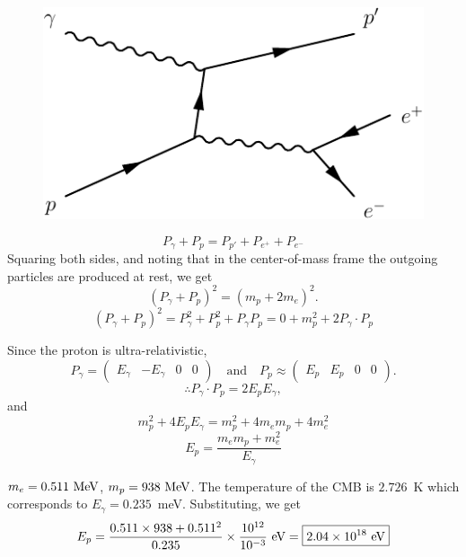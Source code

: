 \begin{figure}[H]
  \centering
  \includegraphics{feynmp/BH_pg.pdf}
\end{figure}

\begin{equation}
  P_\gamma + P_p = P_{p'} + P_{e^{+}} + P_{e^{-}}
\end{equation}
Squaring both sides, and noting that in the center-of-mass frame the outgoing particles are produced at rest, we get
\begin{equation}
  (P_\gamma + P_p)^2 = (m_p + 2m_e)^2.
\end{equation}
\begin{equation}
  (P_\gamma + P_p)^2 = P_\gamma^2 + P_p^2 + P_\gamma P_p = 0 + m_p^2 + 2 P_\gamma \cdot P_p
\end{equation}

Since the proton is ultra-relativistic,
\begin{equation}
  P_\gamma =  \begin{pmatrix} E_\gamma & -E_\gamma & 0 & 0 \end{pmatrix}
  \quad \text{and} \quad
  P_p \approx \begin{pmatrix} E_p      & E_p       & 0 & 0 \end{pmatrix}.
\end{equation}
\begin{equation}
  \therefore P_\gamma \cdot P_p = 2 E_p E_\gamma,
\end{equation}
and
\begin{equation}
  m_p^2 + 4 E_p E_\gamma = m_p^2 + 4 m_e m_p + 4 m_e^2
\end{equation}
\begin{equation}
  \boxed{ E_p = \frac{m_e m_p + m_e^2}{E_\gamma} }
\end{equation}

$m_e = 0.511~\text{MeV}$, $m_p = 938~\text{MeV}$. The temperature of the CMB is $2.726$~K which corresponds to $E_\gamma = 0.235$~meV. Substituting, we get
\begin{equation}
  E_p = \frac{0.511\times 938 + 0.511^2}{0.235} \times \frac{10^{12}}{10^{-3}} ~\text{eV}
      = \boxed{ 2.04\times 10^{18} ~\text{eV} }
\end{equation}

